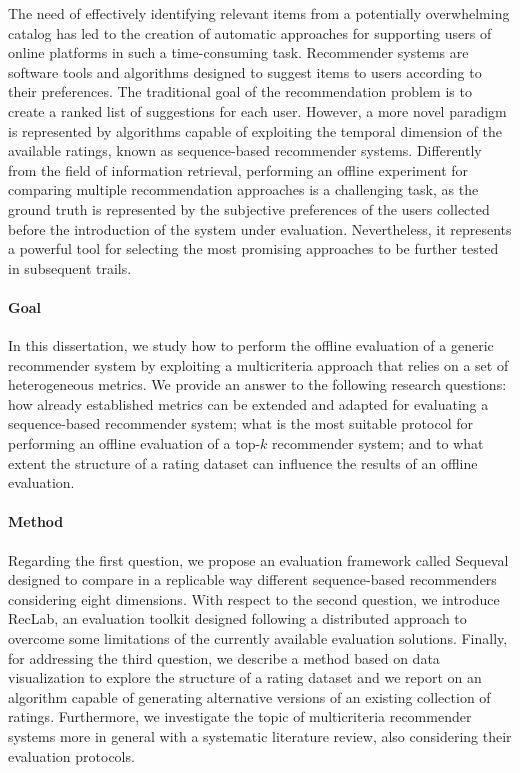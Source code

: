 The need of effectively identifying relevant items from a potentially overwhelming catalog has led to the creation of automatic approaches for supporting users of online platforms in such a time-consuming task. Recommender systems are software tools and algorithms designed to suggest items to users according to their preferences. The traditional goal of the recommendation problem is to create a ranked list of suggestions for each user. However, a more novel paradigm is represented by algorithms capable of exploiting the temporal dimension of the available ratings, known as sequence-based recommender systems. Differently from the field of information retrieval, performing an offline experiment for comparing multiple recommendation approaches is a challenging task, as the ground truth is represented by the subjective preferences of the users collected before the introduction of the system under evaluation. Nevertheless, it represents a powerful tool for selecting the most promising approaches to be further tested in subsequent trails.

\paragraph{Goal}

In this dissertation, we study how to perform the offline evaluation of a generic recommender system by exploiting a multicriteria approach that relies on a set of heterogeneous metrics. We provide an answer to the following research questions: how already established metrics can be extended and adapted for evaluating a sequence-based recommender system; what is the most suitable protocol for performing an offline evaluation of a top-$k$ recommender system; and to what extent the structure of a rating dataset can influence the results of an offline evaluation.

\paragraph{Method}

Regarding the first question, we propose an evaluation framework called Sequeval designed to compare in a replicable way different sequence-based recommenders considering eight dimensions. With respect to the second question, we introduce RecLab, an evaluation toolkit designed following a distributed approach to overcome some limitations of the currently available evaluation solutions. Finally, for addressing the third question, we describe a method based on data visualization to explore the structure of a rating dataset and we report on an algorithm capable of generating alternative versions of an existing collection of ratings. Furthermore, we investigate the topic of multicriteria recommender systems more in general with a systematic literature review, also considering their evaluation protocols.

